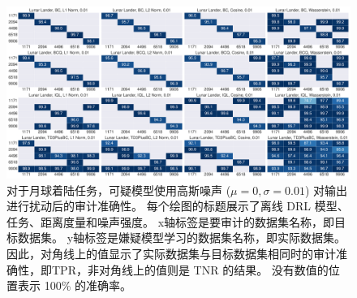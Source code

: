 \begin{figure}[!t]
    \includegraphics[width=\hsize]{figure/orl_auditor/overall_sac_lunarlander_20230201160601003.pdf}
    \caption{
    对于月球着陆任务，可疑模型使用高斯噪声 ($\mu=0, \sigma=0.01$) 对输出进行扰动后的审计准确性。
    每个绘图的标题展示了离线 DRL 模型、任务、距离度量和噪声强度。
    x轴标签是要审计的数据集名称，即目标数据集。
    y轴标签是嫌疑模型学习的数据集名称，即实际数据集。
    因此，对角线上的值显示了实际数据集与目标数据集相同时的审计准确性，即TPR，非对角线上的值则是 TNR 的结果。
    没有数值的位置表示 100\% 的准确率。
    }
    \label{fig:robustness 0.01 on lunarlander}
    \end{figure}
    
